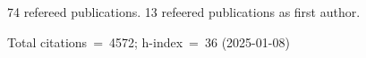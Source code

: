 74 refereed publications. 13 refeered publications as first author.

Total citations~=~4572; h-index~=~36 (2025-01-08)